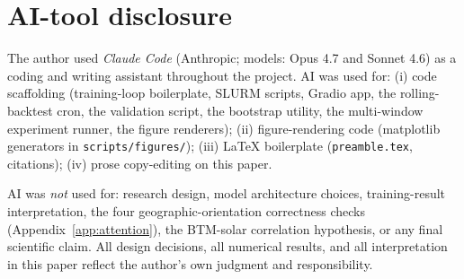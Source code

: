 
\section{AI-tool disclosure}
\label{app:ai}

The author used \emph{Claude Code} (Anthropic; models: Opus 4.7 and
Sonnet 4.6) as a coding and writing assistant throughout the project.
AI was used for: (i) code scaffolding (training-loop boilerplate, SLURM
scripts, Gradio app, the rolling-backtest cron, the validation script,
the bootstrap utility, the multi-window experiment runner, the figure
renderers); (ii) figure-rendering code (matplotlib generators in
\texttt{scripts/figures/}); (iii) \LaTeX{} boilerplate
(\texttt{preamble.tex}, citations); (iv) prose copy-editing on this
paper.

AI was \emph{not} used for: research design, model architecture
choices, training-result interpretation, the four geographic-orientation
correctness checks (Appendix~\ref{app:attention}), the BTM-solar
correlation hypothesis, or any final scientific claim. All design
decisions, all numerical results, and all interpretation in this paper
reflect the author's own judgment and responsibility.
